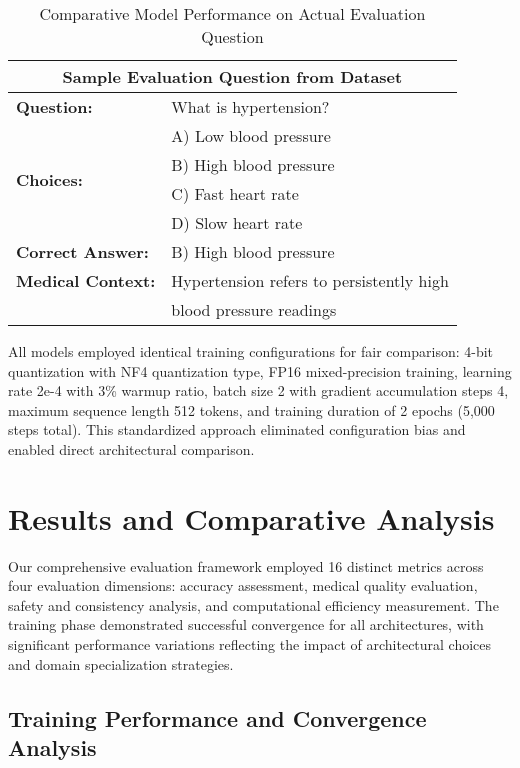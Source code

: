 \documentclass[conference]{IEEEtran}
\begin{document}
\begin{table}[!t]
\renewcommand{\arraystretch}{1.3}
\caption{Comparative Model Performance on Actual Evaluation Question}
\label{tab:model_comparison}
\centering
\begin{tabular}{|l|l|}
\hline
\multicolumn{2}{|c|}{\textbf{Sample Evaluation Question from Dataset}} \\
\hline
\textbf{Question:} & What is hypertension? \\
\hline
\multirow{4}{*}{\textbf{Choices:}} & A) Low blood pressure \\
& B) High blood pressure \\
& C) Fast heart rate \\
& D) Slow heart rate \\
\hline
\textbf{Correct Answer:} & B) High blood pressure \\
\hline
\textbf{Medical Context:} & Hypertension refers to persistently high \\
& blood pressure readings \\
\hline
\end{tabular}
\end{table}

All models employed identical training configurations for fair comparison: 4-bit quantization with NF4 quantization type, FP16 mixed-precision training, learning rate 2e-4 with 3\% warmup ratio, batch size 2 with gradient accumulation steps 4, maximum sequence length 512 tokens, and training duration of 2 epochs (5,000 steps total). This standardized approach eliminated configuration bias and enabled direct architectural comparison.

\section{Results and Comparative Analysis}

Our comprehensive evaluation framework employed 16 distinct metrics across four evaluation dimensions: accuracy assessment, medical quality evaluation, safety and consistency analysis, and computational efficiency measurement. The training phase demonstrated successful convergence for all architectures, with significant performance variations reflecting the impact of architectural choices and domain specialization strategies.

\subsection{Training Performance and Convergence Analysis}
\end{document}

